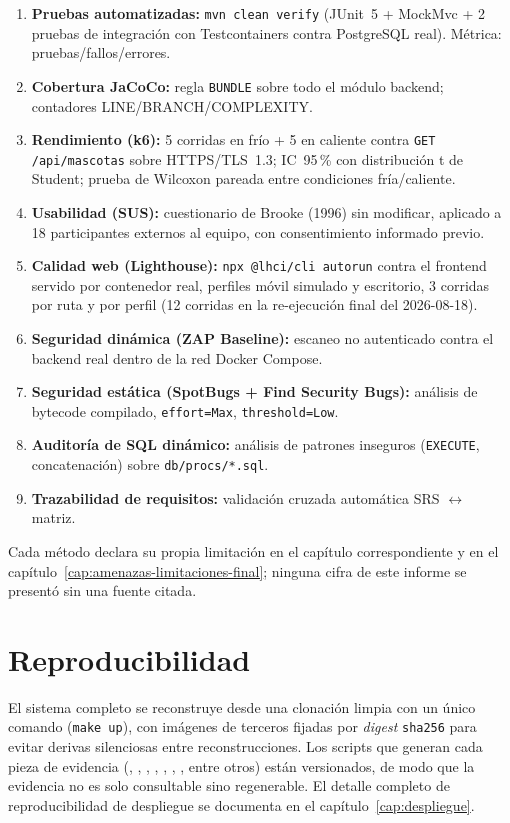 \begin{enumerate}[nosep]
  \item \textbf{Pruebas automatizadas:} \texttt{mvn clean verify}
    (JUnit~5 + MockMvc + 2 pruebas de integraci\'on con Testcontainers
    contra PostgreSQL real). M\'etrica: pruebas/fallos/errores.
  \item \textbf{Cobertura JaCoCo:} regla \texttt{BUNDLE} sobre todo el
    m\'odulo backend; contadores LINE/BRANCH/COMPLEXITY.
  \item \textbf{Rendimiento (k6):} 5 corridas en fr\'io + 5 en caliente
    contra \texttt{GET /api/mascotas} sobre HTTPS/TLS~1.3; IC~95\,\% con
    distribuci\'on t de Student; prueba de Wilcoxon pareada entre
    condiciones fr\'ia/caliente.
  \item \textbf{Usabilidad (SUS):} cuestionario de Brooke (1996) sin
    modificar, aplicado a 18 participantes externos al equipo, con
    consentimiento informado previo.
  \item \textbf{Calidad web (Lighthouse):} \texttt{npx @lhci/cli autorun}
    contra el frontend servido por contenedor real, perfiles m\'ovil
    simulado y escritorio, 3 corridas por ruta y por perfil (12 corridas
    en la re-ejecuci\'on final del 2026-08-18).
  \item \textbf{Seguridad din\'amica (ZAP Baseline):} escaneo no
    autenticado contra el backend real dentro de la red Docker Compose.
  \item \textbf{Seguridad est\'atica (SpotBugs + Find Security Bugs):}
    an\'alisis de bytecode compilado, \texttt{effort=Max},
    \texttt{threshold=Low}.
  \item \textbf{Auditor\'ia de SQL din\'amico:} an\'alisis de patrones
    inseguros (\texttt{EXECUTE}, concatenaci\'on) sobre \texttt{db/procs/*.sql}.
  \item \textbf{Trazabilidad de requisitos:} validaci\'on cruzada
    autom\'atica SRS $\leftrightarrow$ matriz.
\end{enumerate}

Cada m\'etodo declara su propia limitaci\'on en el cap\'itulo
correspondiente y en el cap\'itulo~\ref{cap:amenazas-limitaciones-final}; ninguna
cifra de este informe se present\'o sin una fuente citada.

\section{Reproducibilidad}

El sistema completo se reconstruye desde una clonaci\'on limpia con un
\'unico comando (\texttt{make up}), con im\'agenes de terceros fijadas por
\emph{digest} \texttt{sha256} para evitar derivas silenciosas entre
reconstrucciones. Los scripts que generan cada pieza de evidencia
(,
, ,
, ,
, , entre
otros) est\'an versionados, de modo que la evidencia no es solo consultable
sino regenerable. El detalle completo de reproducibilidad de despliegue se
documenta en el cap\'itulo~\ref{cap:despliegue}.

